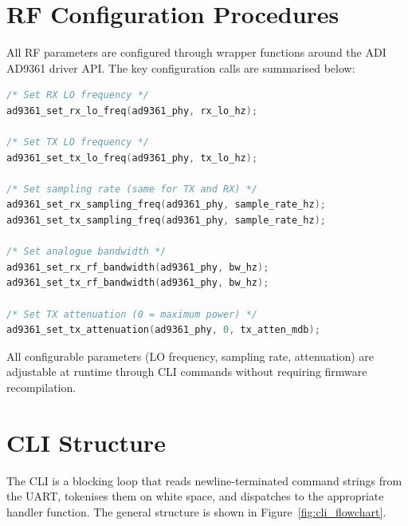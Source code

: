 \documentclass[12pt, a4paper, oneside]{report}
\begin{document}
\section{RF Configuration Procedures}

All RF parameters are configured through wrapper functions around the ADI AD9361 driver API. The key configuration calls are summarised below:

\begin{lstlisting}[language=C, caption={RF configuration call sequence (excerpt from main.c).}]
/* Set RX LO frequency */
ad9361_set_rx_lo_freq(ad9361_phy, rx_lo_hz);

/* Set TX LO frequency */
ad9361_set_tx_lo_freq(ad9361_phy, tx_lo_hz);

/* Set sampling rate (same for TX and RX) */
ad9361_set_rx_sampling_freq(ad9361_phy, sample_rate_hz);
ad9361_set_tx_sampling_freq(ad9361_phy, sample_rate_hz);

/* Set analogue bandwidth */
ad9361_set_rx_rf_bandwidth(ad9361_phy, bw_hz);
ad9361_set_tx_rf_bandwidth(ad9361_phy, bw_hz);

/* Set TX attenuation (0 = maximum power) */
ad9361_set_tx_attenuation(ad9361_phy, 0, tx_atten_mdb);
\end{lstlisting}

All configurable parameters (LO frequency, sampling rate, attenuation) are adjustable at runtime through CLI commands without requiring firmware recompilation.

\section{CLI Structure}

The CLI is a blocking loop that reads newline-terminated command strings from the UART, tokenises them on white space, and dispatches to the appropriate handler function. The general structure is shown in Figure~\ref{fig:cli_flowchart}.
\end{document}
